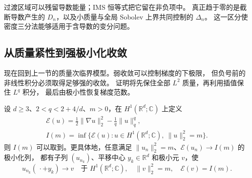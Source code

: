过渡区域可以残留导数能量；IMS 恒等式把它留在非负项中。
真正趋于零的是截断导数产生的 \(D_n\)，以及小质量与全局 Sobolev 上界共同控制的 \(\Delta_n\)。
这一区分使密度三分法能够适用于含导数的变分问题。

\subsection{从质量紧性到强极小化收敛}
\label{b2:subsec:F-minimizing-compactness}

现在回到上一节的质量次临界模型。弱收敛可以控制梯度的下极限，
但负号前的非线性积分必须取得足够强的收敛。
证明将先保住全部 \(L^2\) 质量，再利用插值保住 \(L^q\) 积分，
最后由极小性恢复梯度范数。

\begin{theorem}[质量约束极小元与模平移紧性]
\label{b2:thm:F-minimizer}
设 \(d\ge3\)、\(2<q<2+4/d\)、\(m>0\)，在
\(H^1(\mathbb R^d;\mathbb C)\) 上定义
\[
 \begin{gathered}
 \mathcal E(u)=\frac12\|\nabla u\|_2^2-\frac1q\|u\|_q^q,\\
 I(m)=\inf\{\mathcal E(u):u\in H^1(\mathbb R^d;\mathbb C),\ \|u\|_2^2=m\}.
 \end{gathered}
\]
则 \(I(m)\) 可以取到。更具体地，任意满足
\(\|u_n\|_2^2=m\)、\(\mathcal E(u_n)\to I(m)\) 的极小化列，
都有子列 \((u_{n_k})\)、平移中心 \(y_k\in\mathbb R^d\) 和极小元 \(v\)，使
\[
 u_{n_k}(\,\cdot+y_k)\longrightarrow v
 \quad\text{于 }H^1(\mathbb R^d;\mathbb C),
 \quad\|v\|_2^2=m,\quad\mathcal E(v)=I(m).
\]
\end{theorem}
